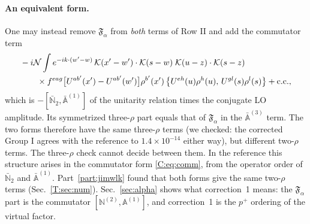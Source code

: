 \documentclass[10pt]{article}
\numberwithin{equation}{section}
\newcommand{\KK}{\mathcal K}
\newcommand{\NN}{\mathcal N}
\begin{document}
\paragraph{An equivalent form.} One may instead remove $\mathfrak F_\alpha$ from \emph{both} terms of Row II and add the commutator term
\begin{align}
&-i\NN\int e^{-ik\cdot(w'-w)}\,\KK(x'-w')\cdot\KK(s-w)\;\KK(u-z)\cdot\KK(s-z)\notag\\
&\qquad\times f^{eag}\big[U^{ab'}(x')-U^{ab'}(w')\big]\rho^{b'}(x')\,\big\{U^{eh}(u)\rho^h(u),\,U^{gl}(s)\rho^l(s)\big\}+{\rm c.c.},
\label{C:eq:comm}
\end{align}
which is $-[\bar{\mathbb N}_2,\bar{\mathbb A}^{(1)}]$ of the unitarity relation times the conjugate LO amplitude. Its symmetrized three-$\rho$ part equals that of $\mathfrak F_\alpha$ in the $\bar{\mathbb A}^{(3)}$ term. The two forms therefore have the same three-$\rho$ terms (we checked: the corrected Group I agrees with the reference to $1.4\times10^{-14}$ either way), but different two-$\rho$ terms. The three-$\rho$ check cannot decide between them. In the reference this structure arises in the commutator form \eqref{C:eq:comm}, from the operator order of $\bar{\mathbb N}_2$ and $\bar{\mathbb A}^{(1)}$. Part~\ref{part:jimwlk} found that both forms give the same two-$\rho$ terms (Sec.~\ref{T:sec:num}). Sec.~\ref{sec:alpha} shows what correction~1 means: the $\mathfrak F_\alpha$ part is the commutator $[\mathbb N^{(2)},\mathbb A^{(1)}]$, and correction~1 is the $p^+$ ordering of the virtual factor.
\end{document}
